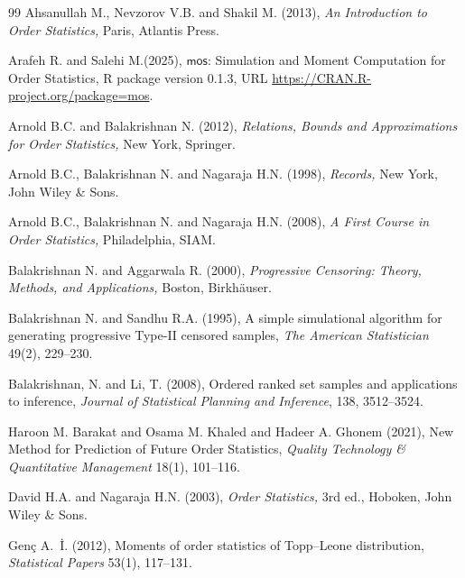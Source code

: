 \documentclass[twoside]{article}
\begin{document}
\begin{thebibliography}{99}
Ahsanullah M., Nevzorov V.B. and Shakil M. (2013), {\it An Introduction to Order Statistics,} Paris, Atlantis Press.

Arafeh R. and Salehi M.(2025), $\mathsf{mos}$: Simulation and Moment Computation for Order Statistics, R package version 0.1.3, URL \url{https://CRAN.R-project.org/package=mos}.

Arnold B.C. and Balakrishnan N. (2012), {\it Relations, Bounds and Approximations for Order Statistics,} New York, Springer.

Arnold B.C., Balakrishnan N. and Nagaraja H.N. (1998), {\it Records,} New York, John Wiley \& Sons.

Arnold B.C., Balakrishnan N. and Nagaraja H.N. (2008), {\it A First Course in Order Statistics,} Philadelphia, SIAM.

Balakrishnan N. and Aggarwala R. (2000), {\it Progressive Censoring: Theory, Methods, and Applications,} Boston, Birkh\"auser.

Balakrishnan N. and Sandhu R.A. (1995), A simple simulational algorithm for generating progressive Type-II censored samples, {\it The American Statistician} 49(2), 229--230.

Balakrishnan, N. and Li, T. (2008),
Ordered ranked set samples and applications to inference, \textit{Journal of Statistical Planning and Inference}, 138, 3512--3524.

Haroon M. Barakat and Osama M. Khaled and Hadeer A. Ghonem (2021), New Method for Prediction of Future Order Statistics, {\it Quality Technology \& Quantitative Management} 18(1), 101--116.

David H.A. and Nagaraja H.N. (2003), {\it Order Statistics,} 3rd ed., Hoboken, John Wiley \& Sons.

Gen\c{c} A.\ \.{I}. (2012), Moments of order statistics of Topp--Leone distribution, {\it Statistical Papers} 53(1), 117--131.


\end{thebibliography}
\end{document}
